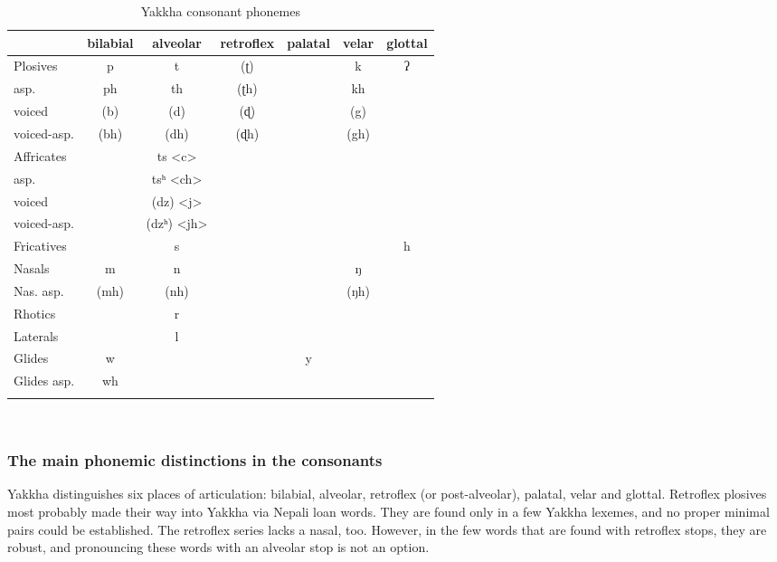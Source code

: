 \begin{table}[htp]
\begin{centering}
{\small
\begin{tabular}{lcccccc}
\lsptoprule
			& {\sc bilabial} &	{\sc alveolar} &	{\sc retroflex }	&	{\sc palatal }&	{\sc velar }&		{\sc glottal}\\
\midrule
{\sc Plosives		}& p   	&	t   	&	(ʈ)  	&			&	k   	& ʔ\\
 {\sc asp.}		& ph   &	th  	&	 (ʈh) 	&			&	kh 		&\\

{\sc voiced}& (b)  	&	(d)   	&	 (ɖ) 	&			&	(g)   	&\\
 {\sc voiced-asp.	}	& (bh)   &	(dh)  	&	  (ɖh)	&			&	(gh) 	&\\

{\sc Affricates 	}&		&	ts <c>		&	  	&		 	&			&	\\
{\sc asp.} 	&		&	tsʰ <ch>		&	 	&	  	&			&\\
{\sc  voiced}	&		&	(dz)	 <j>	&	  	&	 &			&	\\
{\sc voiced-asp.} 	&		&	(dzʰ) <jh>		&	 	&	   	&			&\\

{\sc Fricatives }	&		&	 		s&		&		 	&		 	& h	\\
{\sc Nasals	}	&	m 	&	n		&		&			&		ŋ	&	\\
{\sc Nas. asp.}		&	(mh)	&	(nh)		&		&			&		(ŋh)	&	\\
{\sc Rhotics 	}&		&			r&		 &			&			&	\\
{\sc Laterals	}&		&			l&		 &			&			&  	\\
{\sc Glides 	}	& w		&			&		&y			&		 	&	\\
{\sc Glides asp.} & wh	&			&		&			&			&\\
\lspbottomrule
\end{tabular}\\
}
\caption{Yakkha consonant phonemes}\label{fig-consonants}
\end{centering}
\end{table}


\subsubsection{The main phonemic distinctions in the consonants}


Yakkha distinguishes six places of articulation: bilabial, alveolar, retroflex (or post-alveolar), palatal, velar and glottal. Retroflex plosives most probably made their way into Yakkha via Nepali loan words. They are found only in a few Yakkha lexemes, and no proper minimal pairs could be established. The retroflex series lacks a nasal, too. However, in the few words that are found with retroflex stops, they are robust, and pronouncing these words with an alveolar stop is not an option. 

